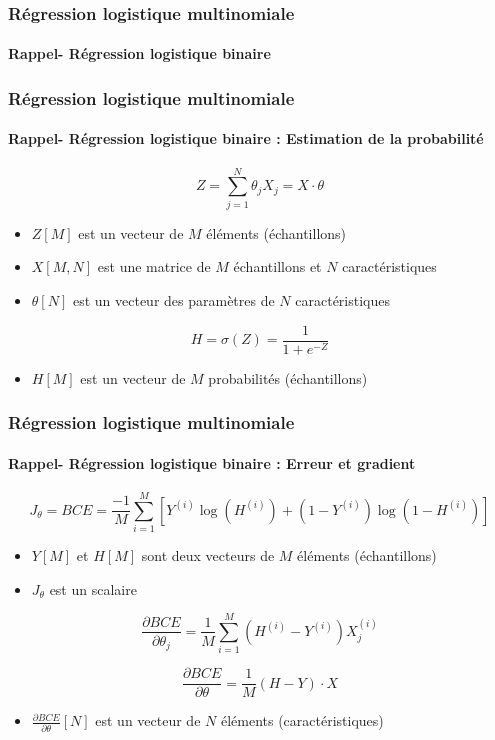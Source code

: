\documentclass[xcolor=table]{beamer}
\begin{document}
\begin{frame}
	\frametitle{Régression logistique multinomiale}
	\framesubtitle{Rappel- Régression logistique binaire}
	
	
\end{frame}

\begin{frame}
\frametitle{Régression logistique multinomiale}
\framesubtitle{Rappel- Régression logistique binaire : Estimation de la probabilité}

\[Z = \sum_{j=1}^{N} \theta_j X_j = X \cdot \theta\]
\begin{itemize}
	\item $Z[M]$ est un vecteur de $M$ éléments (échantillons)
	\item $X[M, N]$ est une matrice de $M$ échantillons et $N$ caractéristiques
	\item $\theta[N]$ est un vecteur des paramètres de $N$ caractéristiques
\end{itemize}

\[H = \sigma(Z) = \frac{1}{1+e^{-Z}}\]

\begin{itemize}
	\item $H[M]$ est un vecteur de $M$ probabilités (échantillons)
\end{itemize}

\end{frame}

\begin{frame}
	\frametitle{Régression logistique multinomiale}
	\framesubtitle{Rappel- Régression logistique binaire : Erreur et gradient}
	
	\[J_\theta = BCE = \frac{-1}{M} \sum\limits_{i=1}^{M} [Y^{(i)} \log(H^{(i)}) + (1- Y^{(i)}) \log(1 - H^{(i)})]\]
	\begin{itemize}
		\item $Y[M]$ et $H[M]$ sont deux vecteurs de $M$ éléments (échantillons)
		\item $J_\theta$ est un scalaire
	\end{itemize}
	
	
	\[
	\frac{\partial BCE}{\partial \theta_j} = \frac{1}{M} \sum\limits_{i=1}^{M} (H^{(i)} - Y^{(i)}) X_j^{(i)}
	\]
	
	\[
	\frac{\partial BCE}{\partial \theta} = \frac{1}{M} (H - Y) \cdot X
	\]
	
	\begin{itemize}
		\item $\frac{\partial BCE}{\partial \theta}[N]$ est un vecteur de $N$ éléments (caractéristiques)
	\end{itemize}
	
\end{frame}
\end{document}
